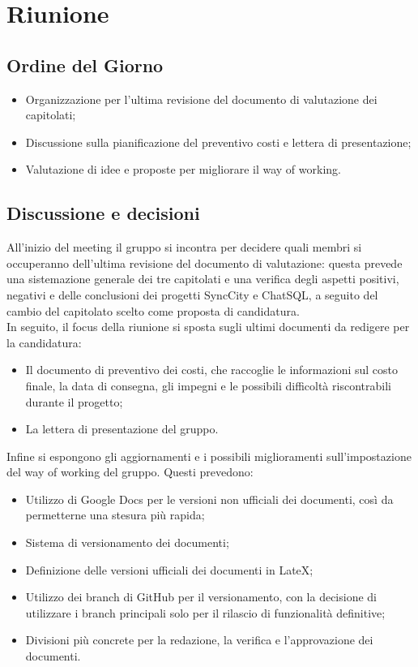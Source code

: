 \section{Riunione}
\subsection{Ordine del Giorno}
\begin{itemize}
	\item Organizzazione per l’ultima revisione del documento di valutazione dei capitolati;
	\item Discussione sulla pianificazione del preventivo costi e lettera di presentazione;
	\item Valutazione di idee e proposte per migliorare il way of working.
\end{itemize}

\subsection{Discussione e decisioni}

All’inizio del meeting il gruppo si incontra per decidere quali membri si occuperanno dell’ultima revisione del documento di valutazione: questa prevede una sistemazione generale dei tre capitolati e una verifica degli aspetti positivi, negativi e delle conclusioni dei progetti SyncCity e ChatSQL, a seguito del cambio del capitolato scelto come proposta di candidatura. \\
In seguito, il focus della riunione si sposta sugli ultimi documenti da redigere per la candidatura: 
\begin{itemize}
	\item Il documento di preventivo dei costi, che raccoglie le informazioni sul costo finale, la data di consegna, gli impegni e le possibili difficoltà riscontrabili durante il progetto;
	\item La lettera di presentazione del gruppo.
\end{itemize}
Infine si espongono gli aggiornamenti e i possibili miglioramenti sull’impostazione del way of working del gruppo. Questi prevedono:
\begin{itemize}
	\item Utilizzo di Google Docs per le versioni non ufficiali dei documenti, così da permetterne una stesura più rapida;
	\item Sistema di versionamento dei documenti;
	\item Definizione delle versioni ufficiali dei documenti in LateX;
	\item Utilizzo dei branch di GitHub per il versionamento, con la decisione di utilizzare i branch principali solo per il rilascio di funzionalità definitive;
	\item Divisioni più concrete per la redazione, la verifica e l’approvazione dei documenti.
\end{itemize}

